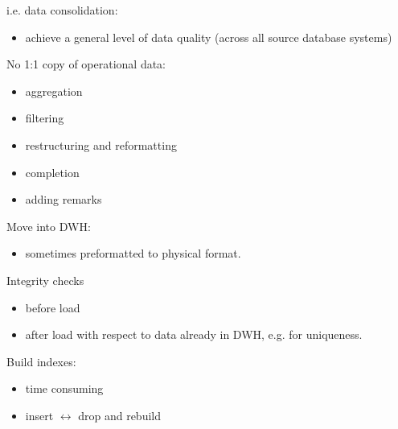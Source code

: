 \begin{breakbox}
\newline i.e. data consolidation:
\begin{itemize}
	\item achieve a general level of data quality (across all source database systems)
\end{itemize}
No 1:1 copy of operational data:
\begin{itemize}
	\item aggregation
	\item filtering
	\item restructuring and reformatting
	\item completion
	\item adding remarks
\end{itemize}
\end{breakbox}

\begin{breakbox}
\newline Move into DWH:
\begin{itemize}
	\item sometimes preformatted to physical format.
\end{itemize}
Integrity checks
\begin{itemize}
	\item before load
	\item after load with respect to data already in DWH, e.g. for uniqueness.
\end{itemize}
Build indexes:
\begin{itemize}
	\item time consuming
	\item insert $\leftrightarrow$ drop and rebuild
\end{itemize}
\end{breakbox}
